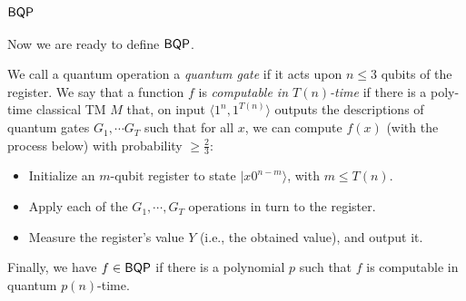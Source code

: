 \subsection{${\mathsf{BQP}}$}
Now we are ready to define ${\mathsf{BQP}}$.
\begin{definition}
We call a quantum operation a \emph{quantum gate} if it acts upon $n \le 3$ qubits of the register. We say that a function $f$ is \emph{computable in $T(n)$-time} if there is a poly-time classical TM $M$ that, on input $\langle 1^n, 1^{T(n)}\rangle$ outputs the descriptions of quantum gates $G_1, \cdots G_T$ such that for all $x$, we can compute $f(x)$ (with the process below) with probability $\ge \frac{2}{3}$:
\begin{itemize}
\item Initialize an $m$-qubit register to state $\vert x0^{n-m}\rangle$, with $m \le T(n)$.
\item Apply each of the $G_1, \cdots, G_T$ operations in turn to the register.
\item Measure the register's value $Y$ (i.e., the obtained value), and output it.
\end{itemize}
Finally, we have $f \in {\ensuremath{\mathsf{BQP}}}$ if there is a polynomial $p$ such that $f$ is computable in quantum $p(n)$-time.
\end{definition}

